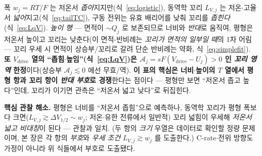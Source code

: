 \documentclass[11pt,a4paper]{article}
\newcommand{\drive}{\mathrm{drive}}
\begin{document}
폭 $w_j=RT/F$ 는 저온서 \emph{좁아}지지만(식~\eqref{eq:logistic}), 동역학 꼬리 $L_{V,j}$ 는 저온$\cdot$고율서
\emph{넓어}지고(식~\eqref{eq:tailTC}), 구동 전위는 유효 배리어를 낮춰 꼬리를 \emph{좁힌다}(식~\eqref{eq:LqV}).
\emph{높이 행} — 면적이 $\sim Q_j$ 로 보존되므로 너비와 \emph{반대}로 움직여, 평형은 저온서 높이고 꼬리는 낮춘다(이
면적-반비례는 \emph{꼬리가 면적의 일부일 때}의 1차 어림 — 꼬리 우세 시 면적이 상승부/꼬리로 갈려 단순 반비례는
약화, 식~\eqref{eq:simplefit}). \textbf{또 $V_\drive$ 열의 ``좁힘$\cdot$높임''(식~\eqref{eq:LqV})은 $\mathcal A_j=sF(V_\drive
-U_j)>0$ 인 \emph{꼬리 영역} 한정}이다(상승부 $\mathcal A_j\lesssim0$ 에선 무효/역). \textbf{이 표의 핵심은 너비$\cdot$높이의
$T$ 열에서 평형 항과 꼬리 항이 \emph{반대 부호}로 경쟁}한다는 점이다 — 평형만 보면 ``저온서 좁고 높다''인데, 꼬리가
이기면 관측은 ``저온서 넓고 낮다''로 뒤집힌다.

\textbf{핵심 관찰 해소.} 평형은 너비를 ``저온서 좁힘''으로 예측하나, 동역학 꼬리가 평형 폭보다 크면($L_{V,j}
\gtrsim\Delta V_{1/2}\sim w_j$; 저온$\cdot$유한 전류에서 일반적) 꼬리 넓힘이 우세해 \emph{저온서 넓고 비대칭}이
된다 — 관찰과 일치. (두 항의 \emph{크기} 우열은 데이터로 확인할 정량 문제이며, 본 장은 각 항의 \emph{부호}와
\emph{우세 조건} $L_{V,j}\gtrsim w_j$ 를 도출한다.) C-rate$\cdot$전위 방향도 가정이 아니라
위 식들에서 부호로 도출됐다.
\end{document}
